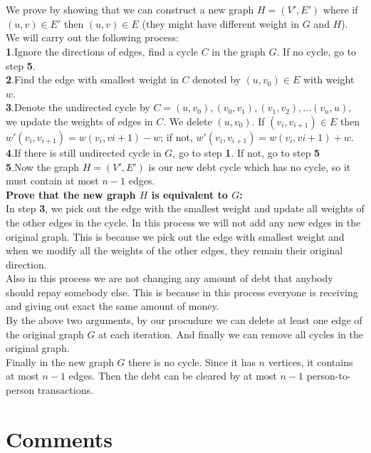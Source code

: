 \documentclass[12pt,letterpaper]{article}
\begin{document}
\section{}
We prove by showing that we can construct a new graph $H=(V',E')$
where if $(u,v)\in E'$ then $(u,v)\in E$ (they might have different weight in $G$ and $H$).\\
We will carry out the following process:\\
\textbf{1}.Ignore the directions of edges, find a cycle $C$ in the graph $G$. If no cycle, go to step \textbf{5}.\\
\textbf{2}.Find the edge with smallest weight in $C$ denoted by $(u,v_0)\in E$ with weight $w$.\\
\textbf{3}.Denote the undirected cycle by $C=(u,v_0),(v_0,v_1),(v_1,v_2),\dots(v_n,u)$,
we update the weights of edges in $C$. We delete $(u,v_0)$. If $(v_i,v_{i+1})\in E$ 
then $w'(v_i,v_{i+1})=w(v_i,v{i+1})-w$; if not, $w'(v_i,v_{i+1})=w(v_i,v{i+1})+w$.\\
\textbf{4}.If there is still undirected cycle in $G$, go to step \textbf{1}.
If not, go to step \textbf{5}\\
\textbf{5}.Now the graph $H=(V',E')$ is our new debt cycle which has no cycle, so it must contain at most $n-1$ edges.\\
\textbf{Prove that the new graph $H$ is equivalent to $G$:}\\
In step \textbf{3}, we pick out the edge with the smallest weight and 
update all weights of the other edges in the cycle.
In this process we will not add any new edges in the original graph.
This is because we pick out the edge with smallest weight and 
when we modify all the weights of the other edges, 
they remain their original direction.\\
Also in this process we are not changing any amount of debt that anybody should repay somebody else.
This is because in this process everyone is receiving and giving out exact the same amount of money.\\
By the above two arguments, 
by our procudure we can delete at least one edge of the original graph $G$ at each iteration.
And finally we can remove all cycles in the original graph.\\
Finally in the new graph $G$ there is no cycle.
Since it has $n$ vertices,
it contains at most $n-1$ edges.
Then the debt can be cleared by at most $n-1$ person-to-person transactions.

\newpage
\section{Comments}
\end{document}
